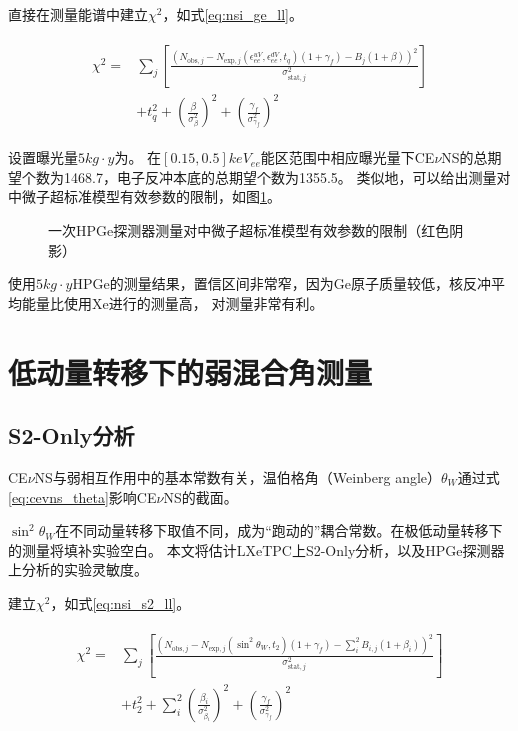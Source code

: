 直接在测量能谱中建立$\chi^2$，如式\ref{eq:nsi_ge_ll}。

\begin{align}
    \label{eq:nsi_ge_ll}
    \begin{split}
    \chi^2 =& \sum_j\left[\frac{\left(N_{\mathrm{obs},j} - N_{\mathrm{exp},j}(\epsilon^{uV}_{ee}, \epsilon^{dV}_{ee}, t_q)(1 + \gamma_f) 
    - B_{j}(1 + \beta)\right)^2}{\sigma^2_{\mathrm{stat},j}}\right] \\
    & + t_q^2 + (\frac{\beta}{\sigma^2_{\beta}})^2 + (\frac{\gamma_f}{\sigma^2_{\gamma_f}})^2
    \end{split}
\end{align}

设置曝光量$5\si{kg\cdot y}$为。
在$[0.15,0.5]\si{keV_{ee}}$能区范围中相应曝光量下CE$\nu$NS的总期望个数为1468.7，电子反冲本底的总期望个数为1355.5。
类似地，可以给出测量对中微子超标准模型有效参数的限制，如图\ref{fig:nsi_sensitivity_ge}。

\begin{figure}
  \centering
  
  \caption{\label{fig:nsi_sensitivity_ge} 一次HPGe探测器测量对中微子超标准模型有效参数的限制（红色阴影）}
\end{figure}

使用$5\si{kg\cdot y}$HPGe的测量结果，置信区间非常窄，因为$\mathrm{Ge}$原子质量较低，核反冲平均能量比使用$\mathrm{Xe}$进行的测量高，
对测量非常有利。

\section{低动量转移下的弱混合角测量}

\subsection{S2-Only分析}

CE$\nu$NS与弱相互作用中的基本常数有关，温伯格角（Weinberg angle）$\theta_W$通过式\ref{eq:cevns_theta}影响CE$\nu$NS的截面。

$\sin^2\theta_W$在不同动量转移下取值不同，成为``跑动的''耦合常数。在极低动量转移下的测量将填补实验空白。
本文将估计LXeTPC上S2-Only分析，以及HPGe探测器上分析的实验灵敏度。

建立$\chi^2$，如式\ref{eq:nsi_s2_ll}。

\begin{align}
    \label{eq:thets_s2_ll}
    \begin{split}
    \chi^2 =& \sum_j\left[\frac{\left(N_{\mathrm{obs},j} - N_{\mathrm{exp},j}(\sin^2\theta_W, t_2)(1 + \gamma_f) 
    - \sum_{i}^2 B_{i,j}(1 + \beta_i)\right)^2}{\sigma^2_{\mathrm{stat},j}}\right] \\
    & + t_2^2 + \sum_{i}^2(\frac{\beta_i}{\sigma^2_{\beta_i}})^2 + (\frac{\gamma_f}{\sigma^2_{\gamma_f}})^2
    \end{split}
\end{align}

